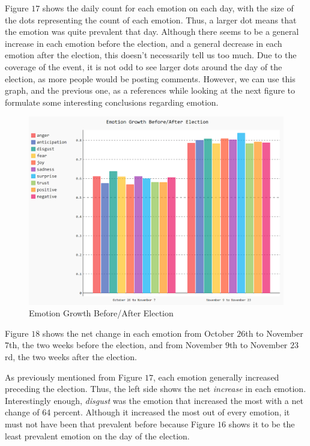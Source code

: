 \documentclass[letterpaper]{article}
\begin{document}
Figure $17$ shows the daily count for each emotion on each day, with the size of the dots representing the count of each emotion. Thus, a larger dot means that the emotion was quite prevalent that day. Although there seems to be a general increase in each emotion before the election, and a general decrease in each emotion after the election, this doesn't necessarily tell us too much. Due to the coverage of the event, it is not odd to see larger dots around the day of the election, as more people would be posting comments. However, we can use this graph, and the previous one, as a references while looking at the next figure to formulate some interesting conclusions regarding emotion.

\begin{figure}[!htb]
\begin{center}
\includegraphics[scale=0.3]{emotion-growth-ba.PNG}
\caption{Emotion Growth Before/After Election}
\label{fig1}
\end{center}
\end{figure}

Figure $18$ shows the net change in each emotion from October $26$th to November $7$th, the two weeks before the election, and from November $9$th to November $23$rd, the two weeks after the election.

As previously mentioned from Figure $17$, each emotion generally increased preceding the election. Thus, the left side shows the net \textit{increase} in each emotion. Interestingly enough, \textit{disgust} was the emotion that increased the most with a net change of 64 percent. Although it increased the most out of every emotion, it must not have been that prevalent before because Figure $16$ shows it to be the least prevalent emotion on the day of the election.
\end{document}
